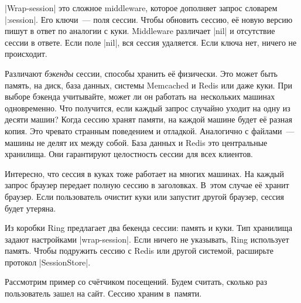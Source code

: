 
\spverb|Wrap-session| это сложное middleware, которое дополняет запрос словарем
\spverb|:session|. Его ключи~--- поля сессии. Чтобы обновить сессию, е\"{е} новую
версию пишут в ответ по аналогии с куки. Middleware различает \spverb|nil| и
отсутствие сессии в ответе. Если поле \spverb|nil|, вся сессия удаляется. Если
ключа нет, ничего не происходит.


Различают \emph{бэкенды} сессии, способы хранить е\"{е} физически. Это может
быть память, на диск, база данных, системы Memcached и Redis или даже куки. При
выборе бэкенда учитывайте, может ли он работать на~нескольких машинах
одновременно. Что получится, если каждый запрос случайно уходит на одну из
десяти машин? Когда сессию хранят памяти, на каждой машине будет е\"{е} разная
копия. Это чревато странным поведением и отладкой. Аналогично с файлами~---
машины не делят их между собой. База данных и Redis это центральные
хранилища. Они гарантируют целостность сессии для всех клиентов.

Интересно, что сессия в куках тоже работает на многих машинах. На каждый запрос
браузер передает полную сессию в заголовках. В~этом случае е\"{е} хранит
браузер. Если пользователь очистит куки или запустит другой браузер, сессия
будет утеряна.

Из коробки Ring предлагает два бекенда сессии: память и куки. Тип хранилища
задают настройками \spverb|wrap-session|. Если ничего не указывать, Ring
использует память. Чтобы подружить сессию с Redis или другой системой, расширьте
протокол \spverb|SessionStore|.

Рассмотрим пример со сч\"{е}тчиком посещений. Будем считать, сколько раз
пользователь зашел на сайт. Сессию храним в~памяти.


\begin{english}
\end{english}


